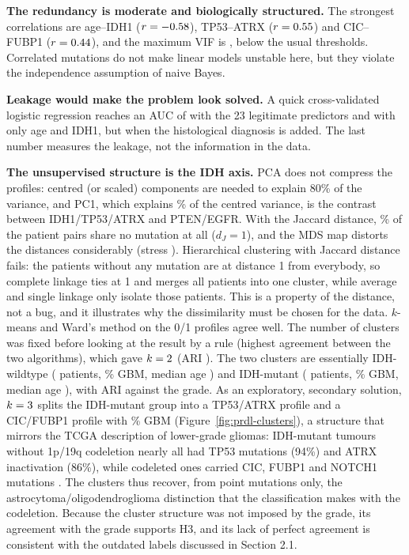 \textbf{The redundancy is moderate and biologically structured.} The strongest correlations are
age--IDH1 ($r = -0.58$), TP53--ATRX ($r = 0.55$) and CIC--FUBP1 ($r = 0.44$),
and the maximum VIF is \MaxVIFEDA, below the usual thresholds. Correlated mutations do not make linear
models unstable here, but they violate the independence assumption of naive Bayes.

\textbf{Leakage would make the problem look solved.} A quick cross-validated logistic regression
reaches an AUC of \BaseAUCAll{} with the 23 legitimate predictors and \BaseAUCAgeIDH{} with only age
and IDH1, but \BaseAUCLeak{} when the histological diagnosis is added. The last number measures
the leakage, not the information in the data.

\textbf{The unsupervised structure is the IDH axis.} PCA does not compress the profiles: \NCompCentred{}
centred (or \NCompScaled{} scaled) components are needed to explain 80\% of the variance, and PC1,
which explains \PCOneCentred\% of the centred variance, is the contrast between IDH1/TP53/ATRX and
PTEN/EGFR. With the Jaccard distance, \PctJaccardOne\% of the patient pairs share no mutation at all
($d_J = 1$), and the MDS map distorts the distances considerably (stress \MDSStress). Hierarchical
clustering with Jaccard distance fails: the \NNoMutation{} patients without any mutation are at
distance 1 from everybody, so complete linkage ties at 1 and merges all patients into one cluster,
while average and single linkage only isolate those \NNoMutation{} patients. This is a property of the
distance, not a bug, and it illustrates why the dissimilarity must be chosen for the data.
$k$-means and Ward's method on the 0/1 profiles agree well. The number of clusters was fixed before
looking at the result by a rule (highest agreement between the two algorithms), which gave
$k = 2$ (ARI \ARIKMWardMain). The two clusters are essentially IDH-wildtype
(\CluMainAN{} patients, \CluMainAGBM\% GBM, median age \CluMainAAge) and IDH-mutant (\CluMainBN{} patients,
\CluMainBGBM\% GBM, median age \CluMainBAge), with ARI \ARIGradeMain{} against the grade. As an
exploratory, secondary solution, $k = 3$ splits the IDH-mutant group into a TP53/ATRX profile
and a CIC/FUBP1 profile with \CluSecondCGBM\% GBM (Figure~\ref{fig:prdl-clusters}), a structure that
mirrors the TCGA description of lower-grade gliomas: IDH-mutant tumours without 1p/19q codeletion
nearly all had TP53 mutations (94\%) and ATRX inactivation (86\%), while codeleted ones carried CIC,
FUBP1 and NOTCH1 mutations \cite{tcga2015lgg}. The clusters thus recover, from point mutations only,
the astrocytoma/oligodendroglioma distinction that the classification makes with the codeletion. Because the
cluster structure was not imposed by the grade, its agreement with the grade supports H3, and its
lack of perfect agreement is consistent with the outdated labels discussed in Section 2.1.

